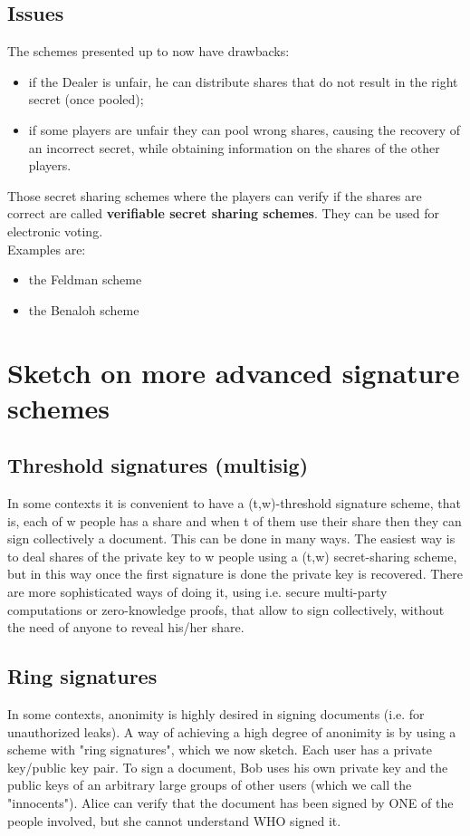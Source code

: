 \documentclass[a4paper, 10pt, titlepage]{article}
\begin{document}
\subsection{Issues}
The schemes presented up to now have drawbacks:
\begin{itemize}
\item if the Dealer is unfair, he can distribute shares that do not result in the right secret (once pooled);
\item if some players are unfair they can pool wrong shares, causing the recovery of an incorrect secret, while obtaining information on the shares of the other players.
\end{itemize}
Those secret sharing schemes where the players can verify if the shares are correct are called \textbf{verifiable secret sharing schemes}. They can be used for electronic voting.\\
Examples are:
\begin{itemize}
\item the Feldman scheme
\item the Benaloh scheme
\end{itemize}

\newpage
\section{Sketch on more advanced signature schemes}
\subsection{Threshold signatures (multisig)}
In some contexts it is convenient to have a (t,w)-threshold signature scheme, that is, each of w people has a share and when t of them use their share then they can sign collectively a document.
This can be done in many ways. The easiest way is to deal shares of the private key to w people using a (t,w) secret-sharing scheme, but in this way once the first signature is done the private key is recovered.
There are more sophisticated ways of doing it, using i.e. secure multi-party computations or zero-knowledge proofs, that allow to sign collectively, without the need of anyone to reveal his/her share.

\subsection{Ring signatures}
In some contexts, anonimity is highly desired in signing documents (i.e. for unauthorized leaks).
A way of achieving a high degree of anonimity is by using a scheme with "ring signatures", which we now sketch.
Each user has a private key/public key pair. To sign a document, Bob uses his own private key and the public keys of an arbitrary large groups of other users (which we call the "innocents"). Alice can verify that the document has been signed by ONE of the people involved, but she cannot understand WHO signed it.
\end{document}
